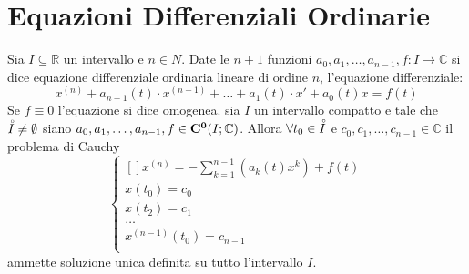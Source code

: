 \section{Equazioni Differenziali Ordinarie}
Sia $I\subseteq\mathbb{R}$ un intervallo e $n\in N$. Date le $n+1$ funzioni $a_0,a_1,\ldots,a_{n-1}, f:I\to\mathbb{C}$ si dice equazione differenziale ordinaria lineare di ordine $n$, l'equazione differenziale:
$$x^{(n)}+a_{n-1}(t)\cdot x^{(n-1)}+\ldots+a_1(t)\cdot x'+a_0(t)x=f(t)$$
Se $f\equiv 0 $ l'equazione si dice omogenea.
\proposition
sia $I$ un intervallo compatto e tale che $\accentset{\circ}{I}\ne \emptyset$ siano $a_0,a_1,\ldots,a_{n-1},f\in \mathbf{C^{0}}(I;\mathbb{C})$. Allora $\forall t_0\in\accentset{\circ}{I}$ e $c_0,c_1,\ldots,c_{n-1}\in\mathbb{C}$ il problema di Cauchy 
$$ \left\{\begin{matrix}[]
x^{(n)}=-\sum\limits_{k=1}^{n-1}\left(a_k(t)x^k\right)+f(t)\\
x(t_0)=c_0\\
x(t_2)=c_1\\
\ldots\\
x^{(n-1)}(t_0)=c_{n-1}\\
\end{matrix}\right.$$
ammette soluzione unica definita su tutto l'intervallo $I$.
